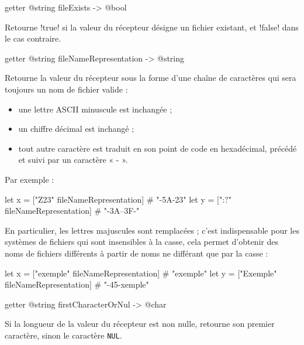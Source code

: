 
\begin{galgasbox}
getter @string fileExists -> @bool
\end{galgasbox}

Retourne \ggs!true! si la valeur du récepteur désigne un fichier existant, et \ggs!false! dans le cas contraire.







\begin{galgasbox}
getter @string fileNameRepresentation -> @string
\end{galgasbox}

Retourne la valeur du récepteur sous la forme d'une chaîne de caractères qui sera toujours un nom de fichier valide :
\begin{itemize}
\item une lettre ASCII minuscule est inchangée ;
\item un chiffre décimal est inchangé ;
\item tout autre caractère est traduit en son point de code en hexadécimal, précédé et suivi par un caractère « - ».
\end{itemize}

Par exemple :
\begin{galgas}
let x = ["Z23" fileNameRepresentation] # "-5A-23"
let y = [":?" fileNameRepresentation] # "-3A--3F-"
\end{galgas}

En particulier, les lettres majuscules sont remplacées ; c'est indispensable pour les systèmes de fichiers qui sont insensibles à la casse, cela permet d'obtenir des noms de fichiers différents à partir de noms ne différant que par la casse :

\begin{galgas}
let x = ["exemple" fileNameRepresentation] # "exemple"
let y = ["Exemple" fileNameRepresentation] # "-45-xemple"
\end{galgas}







\begin{galgasbox}
getter @string firstCharacterOrNul -> @char
\end{galgasbox}

Si la longueur de la valeur du récepteur est non nulle, retourne son premier caractère, sinon le caractère \texttt{NUL}.







